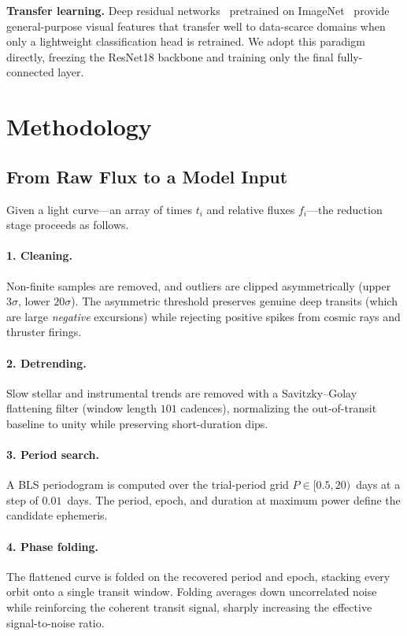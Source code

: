 \documentclass[twocolumn,10pt]{article}
\begin{document}
\textbf{Transfer learning.} Deep residual networks~\cite{he2016} pretrained on
ImageNet~\cite{deng2009} provide general-purpose visual features that transfer
well to data-scarce domains when only a lightweight classification head is
retrained. We adopt this paradigm directly, freezing the ResNet18 backbone and
training only the final fully-connected layer.

\section{Methodology}

\subsection{From Raw Flux to a Model Input}
\label{sec:pipeline}
Given a light curve---an array of times $t_i$ and relative fluxes $f_i$---the
reduction stage proceeds as follows.

\paragraph{1. Cleaning.} Non-finite samples are removed, and outliers are clipped
asymmetrically (upper $3\sigma$, lower $20\sigma$). The asymmetric threshold
preserves genuine deep transits (which are large \emph{negative} excursions) while
rejecting positive spikes from cosmic rays and thruster firings.

\paragraph{2. Detrending.} Slow stellar and instrumental trends are removed with a
Savitzky--Golay flattening filter (window length $101$ cadences), normalizing the
out-of-transit baseline to unity while preserving short-duration dips.

\paragraph{3. Period search.} A BLS periodogram is computed over the trial-period
grid $P \in [0.5, 20)$~days at a step of $0.01$~days. The period, epoch, and
duration at maximum power define the candidate ephemeris.

\paragraph{4. Phase folding.} The flattened curve is folded on the recovered
period and epoch, stacking every orbit onto a single transit window. Folding
averages down uncorrelated noise while reinforcing the coherent transit signal,
sharply increasing the effective signal-to-noise ratio.
\end{document}
